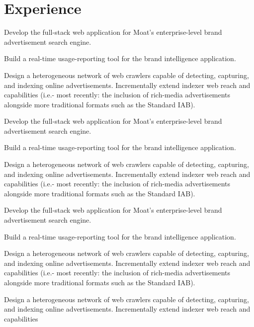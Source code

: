 \documentclass[]{deedy-resume-openfont}
\begin{document}
\hfill
\begin{minipage}[t]{0.66\textwidth} 

    \section{Experience}

        \vspace{\topsep} %
        \begin{tightemize}
            \item Develop the full-stack web application for Moat’s enterprise-level brand advertisement search engine.
            \item Build a real-time usage-reporting tool for the brand intelligence application.
            \item Design a heterogeneous network of web crawlers capable of detecting, capturing, and indexing online advertisements. Incrementally extend indexer web reach and capabilities (i.e.- most recently: the inclusion of rich-media advertisements alongside more traditional formats such as the Standard IAB). 
            \item Develop the full-stack web application for Moat’s enterprise-level brand advertisement search engine.
            \item Build a real-time usage-reporting tool for the brand intelligence application.
            \item Design a heterogeneous network of web crawlers capable of detecting, capturing, and indexing online advertisements. Incrementally extend indexer web reach and capabilities (i.e.- most recently: the inclusion of rich-media advertisements alongside more traditional formats such as the Standard IAB). 
            \item Develop the full-stack web application for Moat’s enterprise-level brand advertisement search engine.
            \item Build a real-time usage-reporting tool for the brand intelligence application.
            \item Design a heterogeneous network of web crawlers capable of detecting, capturing, and indexing online advertisements. Incrementally extend indexer web reach and capabilities (i.e.- most recently: the inclusion of rich-media advertisements alongside more traditional formats such as the Standard IAB). 
            \item Design a heterogeneous network of web crawlers capable of detecting, capturing, and indexing online advertisements. Incrementally extend indexer web reach and capabilities 
        \end{tightemize}
    \sectionsep


\end{minipage}
\end{document}
